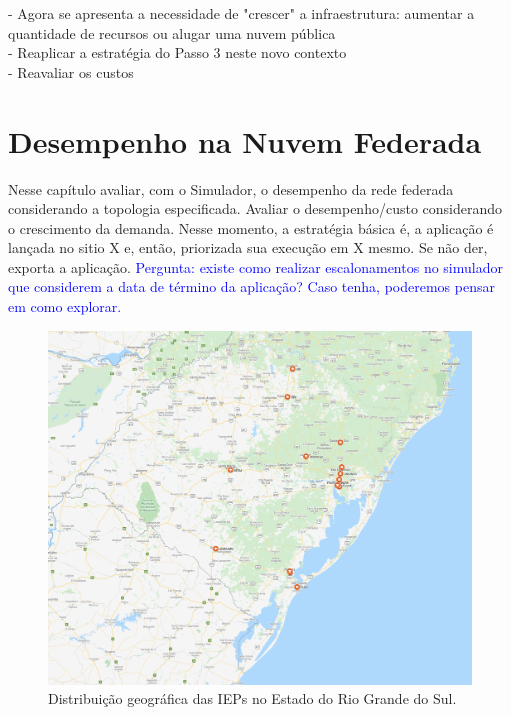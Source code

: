 \documentclass[tese,capa]{texufpel}
\begin{document}
- Agora se apresenta a necessidade de "crescer" a infraestrutura: aumentar a quantidade de recursos ou alugar uma nuvem pública\\
- Reaplicar a estratégia do Passo 3 neste novo contexto\\
- Reavaliar os custos\\


\chapter{Desempenho na Nuvem Federada}

Nesse capítulo avaliar, com o Simulador, o desempenho da rede federada considerando a topologia especificada. Avaliar o desempenho/custo considerando o crescimento da demanda. Nesse momento, a estratégia básica é, a aplicação é lançada no sitio X e, então, priorizada sua execução em X mesmo. Se não der, exporta a aplicação. \textcolor{blue}{Pergunta: existe como realizar escalonamentos no simulador que considerem a data de término da aplicação? Caso tenha, poderemos pensar em como explorar.}

\begin{figure}[H]
	\centering 
	\includegraphics[scale=.25]{images/IEP.png}
	\caption[Distribuição geográfica das IEPs no Estado do Rio Grande do Sul.]{Distribuição geográfica das IEPs no Estado do Rio Grande do Sul.} 
	\label{fig:IEP}
\end{figure}
\end{document}

